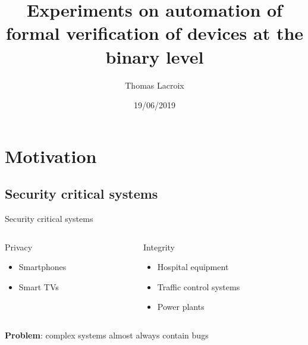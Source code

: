 \documentclass{beamer}
\title{Experiments on automation of formal verification of devices at the binary level}
\subtitle{}
\author{Thomas Lacroix}
\institute{INSA Lyon \\ Soutenance de PFE (Option R\&D)}
\date{19/06/2019}
\begin{document}
\begin{frame}
    \maketitle
\end{frame}


\section{Motivation}


\subsection{Security critical systems}

\begin{frame}{Security critical systems}
    \begin{columns}
        \begin{column}{0.5\textwidth}
            Privacy

            \begin{itemize}
                \item Smartphones
                \item Smart TVs
            \end{itemize}
        \end{column}
        \begin{column}{0.5\textwidth}
            Integrity

            \begin{itemize}
                \item Hospital equipment
                \item Traffic control systems
                \item Power plants
            \end{itemize}
        \end{column}
    \end{columns}

    \vfill
    \pause

    \textbf{Problem}: complex systems almost always contain bugs
\end{frame}
\end{document}

